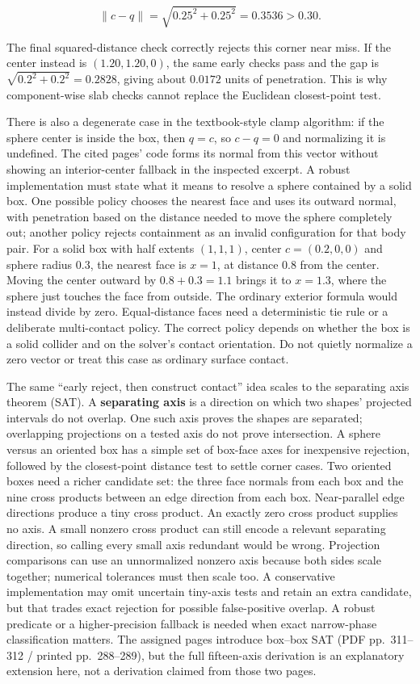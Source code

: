 \[
\|c-q\|=\sqrt{0.25^2+0.25^2}=0.3536>0.30.
\]

The final squared-distance check correctly rejects this corner near miss. If the center instead is \((1.20,1.20,0)\), the same early checks pass and the gap is \(\sqrt{0.2^2+0.2^2}=0.2828\), giving about \(0.0172\) units of penetration. This is why component-wise slab checks cannot replace the Euclidean closest-point test.

There is also a degenerate case in the textbook-style clamp algorithm: if the sphere center is inside the box, then \(q=c\), so \(c-q=0\) and normalizing it is undefined. The cited pages' code forms its normal from this vector without showing an interior-center fallback in the inspected excerpt. A robust implementation must state what it means to resolve a sphere contained by a solid box. One possible policy chooses the nearest face and uses its outward normal, with penetration based on the distance needed to move the sphere completely out; another policy rejects containment as an invalid configuration for that body pair. For a solid box with half extents \((1,1,1)\), center \(c=(0.2,0,0)\) and sphere radius \(0.3\), the nearest face is \(x=1\), at distance \(0.8\) from the center. Moving the center outward by \(0.8+0.3=1.1\) brings it to \(x=1.3\), where the sphere just touches the face from outside. The ordinary exterior formula would instead divide by zero. Equal-distance faces need a deterministic tie rule or a deliberate multi-contact policy. The correct policy depends on whether the box is a solid collider and on the solver's contact orientation. Do not quietly normalize a zero vector or treat this case as ordinary surface contact.

The same ``early reject, then construct contact'' idea scales to the separating axis theorem (SAT). A \textbf{separating axis} is a direction on which two shapes' projected intervals do not overlap. One such axis proves the shapes are separated; overlapping projections on a tested axis do not prove intersection. A sphere versus an oriented box has a simple set of box-face axes for inexpensive rejection, followed by the closest-point distance test to settle corner cases. Two oriented boxes need a richer candidate set: the three face normals from each box and the nine cross products between an edge direction from each box. Near-parallel edge directions produce a tiny cross product. An exactly zero cross product supplies no axis. A small nonzero cross product can still encode a relevant separating direction, so calling every small axis redundant would be wrong. Projection comparisons can use an unnormalized nonzero axis because both sides scale together; numerical tolerances must then scale too. A conservative implementation may omit uncertain tiny-axis tests and retain an extra candidate, but that trades exact rejection for possible false-positive overlap. A robust predicate or a higher-precision fallback is needed when exact narrow-phase classification matters. The assigned pages introduce box--box SAT (PDF pp.~311--312 / printed pp.~288--289), but the full fifteen-axis derivation is an explanatory extension here, not a derivation claimed from those two pages.

